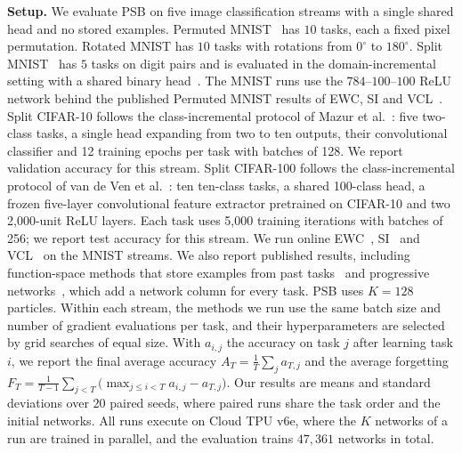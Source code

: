 \textbf{Setup.} We evaluate PSB on five image classification streams with a
single shared head and no stored examples. Permuted
MNIST~\cite{goodfellow2013empirical} has $10$ tasks, each a fixed pixel
permutation. Rotated MNIST has $10$ tasks with rotations from $0^\circ$ to
$180^\circ$. Split MNIST~\cite{zenke2017si} has $5$ tasks on digit pairs and is
evaluated in the domain-incremental setting with a shared binary
head~\cite{vandeven2022types}. The MNIST runs use the
$784$--$100$--$100$ ReLU network behind the published Permuted MNIST
results of EWC, SI and VCL~\cite{nguyen2018vcl}.
Split CIFAR-10 follows the class-incremental protocol of
Mazur et al.~\cite{mazur2021target}: five two-class tasks, a single
head expanding from two to ten outputs, their convolutional classifier
and 12 training epochs per task with batches of 128. We report
validation accuracy for this
stream. Split CIFAR-100 follows the class-incremental protocol of
van de Ven et al.~\cite{vandeven2022types}: ten ten-class tasks, a
shared 100-class head, a frozen five-layer convolutional feature
extractor pretrained on CIFAR-10 and two 2,000-unit ReLU layers.
Each task uses 5,000 training iterations with batches of 256; we report
test accuracy for this stream.
We run online EWC~\cite{schwarz2018progress}, SI~\cite{zenke2017si}
and VCL~\cite{nguyen2018vcl} on the MNIST streams. We also report
published results, including function-space methods that store examples
from past tasks~\cite{titsias2020frcl,pan2020fromp,rudner2022sfsvi}
and progressive networks~\cite{rusu2016progressive}, which add a
network column for every task. PSB uses $K=128$ particles. Within each
stream, the methods we run use the same batch size and number of gradient
evaluations per task, and their hyperparameters are selected by grid
searches of equal size. With $a_{i,j}$ the accuracy on task $j$ after
learning task $i$, we report the final average accuracy
$A_T=\frac1T\sum_{j}a_{T,j}$ and the average forgetting
$F_T=\frac{1}{T-1}\sum_{j<T}\big(\max_{j\le i<T}a_{i,j}-a_{T,j}\big)$. Our results
are means and standard deviations over $20$ paired seeds, where paired runs
share the task order and the initial networks. All runs execute on Cloud TPU
v6e, where the $K$ networks of a run are trained in parallel, and the evaluation
trains $47{,}361$ networks in total.

